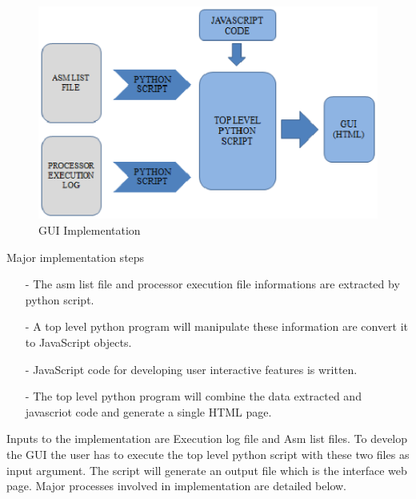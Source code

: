 \begin{figure}[H]
\centering
\includegraphics[width=5.5in]{./figures/gui_impl.eps}
\caption{GUI Implementation} 
\label{fig:gui_impl.eps}
\end{figure}

 Major implementation steps
\begin{itemize}
\item[-] The asm list file and processor execution file informations are extracted by python script.
\item[-] A top level python program will manipulate these information are convert it to JavaScript objects. 
\item[-] JavaScript code for developing user interactive features is written.
\item[-] The top level python program will combine the data extracted and javascriot code and generate a single HTML page. 
\end{itemize}
Inputs to the implementation are Execution log file and Asm list files. To develop the GUI the user has to execute the top level python script with these two files as input argument. The script will generate an output file which is the interface web page. Major processes involved in implementation are detailed below. 



